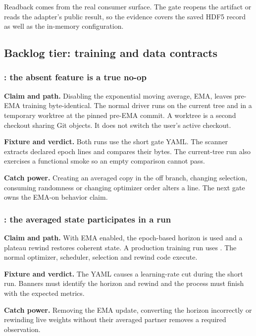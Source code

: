 Readback comes from the real consumer surface.  The gate reopens the artifact
or reads the adapter's public result, so the evidence covers the saved HDF5
record as well as the in-memory configuration.

\subsection{Backlog tier: training and data contracts}

\subsubsection{: the absent feature is a true no-op}

\textbf{Claim and path.}  Disabling the exponential moving average, EMA,
leaves pre-EMA training byte-identical.  The normal driver runs on the current
tree and in a temporary worktree at the pinned pre-EMA commit.  A worktree is
a second checkout sharing Git objects.  It does not switch the user's active
checkout.

\textbf{Fixture and verdict.}  Both runs use the short gate YAML.  The scanner
extracts declared epoch lines and compares their bytes.  The current-tree run
also exercises a functional smoke so an empty comparison cannot pass.

\textbf{Catch power.}  Creating an averaged copy in the off branch, changing
selection, consuming randomness or changing optimizer order alters a line.
The next gate owns the EMA-on behavior claim.

\subsubsection{: the averaged state participates in a run}

\textbf{Claim and path.}  With EMA enabled, the epoch-based horizon is used
and a plateau rewind restores coherent state.  A production training run uses
.  The normal optimizer, scheduler, selection
and rewind code execute.

\textbf{Fixture and verdict.}  The YAML causes a learning-rate cut during the
short run.  Banners must identify the horizon and rewind and the process must
finish with the expected metrics.

\textbf{Catch power.}  Removing the EMA update, converting the horizon
incorrectly or rewinding live weights without their averaged partner removes
a required observation.

